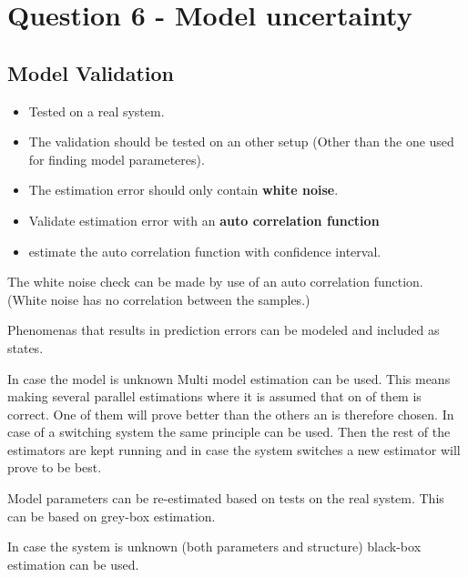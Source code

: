 \chapter{Question 6 - Model uncertainty}

\section*{Model Validation}
\begin{itemize}
         \item Tested on a real system.
         \item The validation should be tested on an other setup (Other than the one used for finding model parameteres).
         \item The estimation error should only contain \textbf{white noise}.
         \item Validate estimation error with an \textbf{auto correlation function}
         \item estimate the auto correlation function with confidence interval.
 \end{itemize} 


The white noise check can be made by use of an auto correlation function. (White noise has no correlation between the samples.)


Phenomenas that results in prediction errors can be modeled and included as states. 

In case the model is unknown Multi model estimation can be used. This means making several parallel estimations where it is assumed that on of them is correct. One of them will prove better than the others an is therefore chosen. In case of a switching system the same principle can be used. Then the rest of the estimators are kept running and in case the system switches a new estimator will prove to be best. 

Model parameters can be re-estimated based on tests on the real system. This can be based on grey-box estimation. 

In case the system is unknown (both parameters and structure) black-box estimation can be used. 